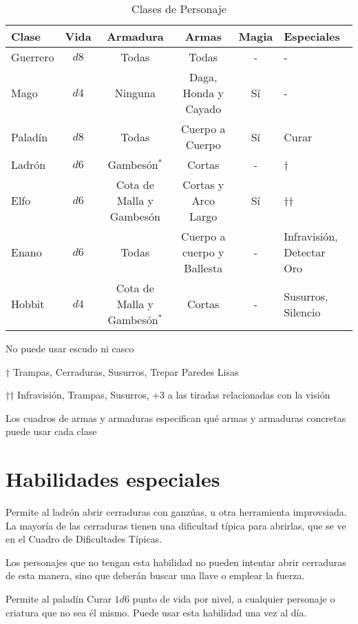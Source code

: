 \begin{multicols}{2}
\begin{table*}[p]
\begin{threeparttable}
\label{c:clases}
\caption{Clases de Personaje}
\begin{tabular}{lccccp{3.7cm}}
\toprule
Clase & Vida & Armadura & Armas & Magia & Especiales\\
\midrule
\midrule
Guerrero &$d8$ & Todas & Todas & - & - \\
Mago &$  d4$ & Ninguna & Daga, Honda y Cayado & Sí & - \\
Paladín &$  d8$ & Todas & Cuerpo a Cuerpo & Sí & Curar \\
Ladrón &$  d6$ & Gambesón$^*$ & Cortas & - & †\\
Elfo &$  d6$ & Cota de Malla y Gambesón & Cortas y Arco Largo & Sí & ††\\
Enano &$  d6$ & Todas & Cuerpo a cuerpo y Ballesta & - & Infravisión, Detectar Oro \\
Hobbit &$  d4$ & Cota de Malla y Gambesón$^*$ & Cortas & - & Susurros, Silencio \\
\bottomrule
\end{tabular}
\begin{tablenotes}
  \item * No puede usar escudo ni casco
  \item †  Trampas, Cerraduras, Susurros, Trepar Paredes Lisas
  \item †† Infravisión, Trampas, Susurros, +3 a las tiradas relacionadas con la visión
  \item Los cuadros de armas y armaduras especifican qué armas y armaduras concretas puede usar cada clase
\end{tablenotes}
\end{threeparttable}
\end{table*}


\section{Habilidades especiales}

 Permite al ladrón abrir cerraduras con ganzúas, u otra
herramienta improvsiada. La mayoría de las cerraduras tienen una dificultad típica
para abrirlas, que se ve en el Cuadro de Dificultades Típicas.

Los personajes que no tengan esta habilidad no pueden intentar abrir cerraduras
de esta manera, sino que deberán buscar una llave o emplear la fuerza.

 Permite al paladín Curar $ 1d6$ punto de vida por nivel, a cualquier
personaje o criatura que no sea él mismo. Puede usar esta habilidad una vez al día.


\end{multicols}

